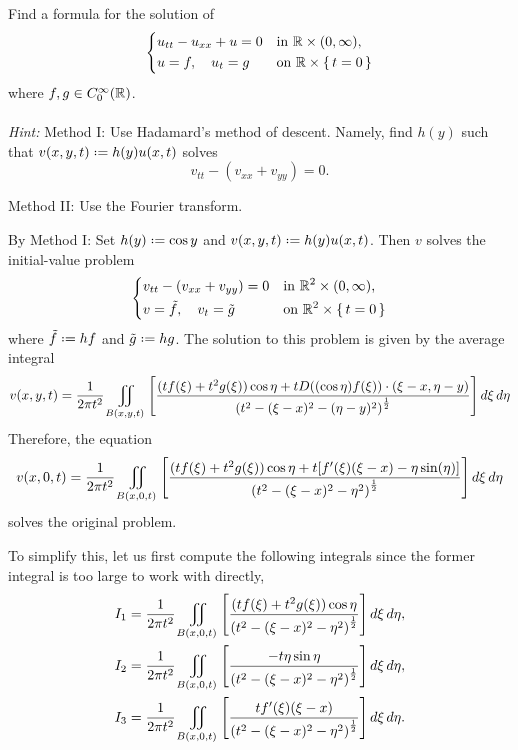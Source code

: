 \begin{problem}
  Find a formula for the solution of
  \[
    \left\{
      \begin{aligned}
        &u_{tt}-u_{xx}+u=0&&\text{in \(\mathbb{R}\times(0,\infty)\),}\\
        &u=f,\quad u_t=g&&\text{on \(\mathbb{R}\times\{\,t=0\,\}\)}
      \end{aligned}
    \right.
  \]
  where \(f,g\in C_0^\infty(\mathbb{R})\).
  \\\\
  \emph{Hint:} Method I: Use Hadamard's method of descent. Namely, find
  \(h(y)\) such that \(v(x,y,t)\defeq h(y)u(x,t)\) solves
  \[
    v_{tt}-(v_{xx}+v_{yy})=0.
  \]

  \noindent Method II: Use the Fourier transform.
\end{problem}
\begin{solution*}
  By Method I: Set \(h(y)\defeq\cos y\) and \(v(x,y,t)\defeq
  h(y)u(x,t)\). Then \(v\) solves the initial-value problem
  \[
    \left\{
      \begin{aligned}
        &v_{tt}-(v_{xx}+v_{yy})=0%
        &&\text{in \(\R^2\times(0,\infty)\),}\\
        &v=\tilde f,\quad v_t=\tilde g
        &&\text{on \(\R^2\times\{\,t=0\,\}\)}
      \end{aligned}
    \right.
  \]
  where \(\tilde f\defeq hf\) and \(\tilde g\defeq hg\). The solution to
  this problem is given by the average integral
  \[
    v(x,y,t)=%
    \frac{1}{2\pi t^2}\iint_{B(x,y,t)}%
    \left[%
      \frac{(tf(\xi)+t^2g(\xi))\cos\eta%
        +tD((\cos\eta)f(\xi))\cdot(\xi-x,\eta-y)}%
      {{(t^2-(\xi-x)^2-(\eta-y)^2)}^{\frac{1}{2}}}%
    \right]\diff\xi\diff\eta
  \]
  Therefore, the equation
  \[
    v(x,0,t)=%
    \frac{1}{2\pi t^2}\iint_{B(x,0,t)}%
    \left[%
      \frac{(tf(\xi)+t^2g(\xi))\cos\eta%
        +t[f'(\xi)(\xi-x)-\eta\sin(\eta)]}%
      {{(t^2-(\xi-x)^2-\eta^2)}^{\frac{1}{2}}}%
    \right]\diff\xi\diff\eta
  \]
  solves the original problem.

  To simplify this, let us first compute the following integrals since the
  former integral is too large to work with directly,
  \begin{align*}
    I_1
    &=\frac{1}{2\pi t^2}\iint_{B(x,0,t)}
      \left[
      \frac{(tf(\xi)+t^2g(\xi))\cos \eta}{{(t^2-(\xi-x)^2-\eta^2)}^{\frac{1}{2}}}
      \right]\mathop{}\!d\xi\mathop{}\!d\eta,
    \\
    I_2
    &=\frac{1}{2\pi t^2}\iint_{B(x,0,t)}
      \left[
      \frac{-t\eta\sin\eta}{{(t^2-(\xi-x)^2-\eta^2)}^{\frac{1}{2}}}
      \right]\mathop{}\!d\xi\mathop{}\!d\eta,
    \\
    I_3
    &=\frac{1}{2\pi t^2}\iint_{B(x,0,t)}
      \left[
      \frac{tf'(\xi)(\xi-x)}{{(t^2-(\xi-x)^2-\eta^2)}^{\frac{1}{2}}}
      \right]\mathop{}\!d\xi\mathop{}\!d\eta.
  \end{align*}


\end{solution*}
